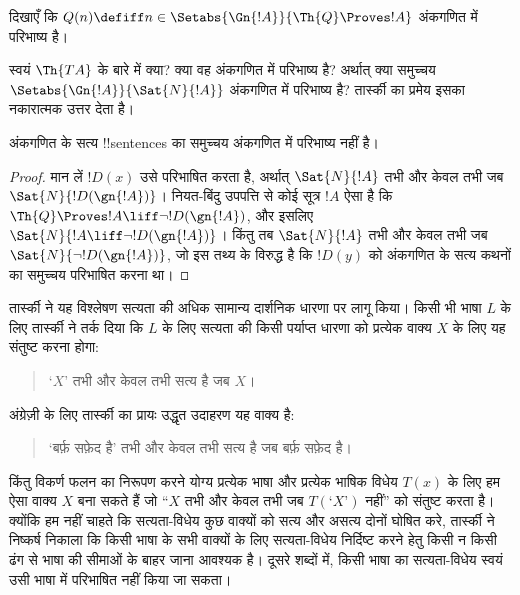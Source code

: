 \documentclass[../../../include/open-logic-section]{subfiles}
\begin{document}
\begin{prob}
दिखाएँ कि $Q(n) \defiff n \in \Setabs{\Gn{!A}}{\Th{Q} \Proves !A}$
अंकगणित में परिभाष्य है।
\end{prob}

स्वयं $\Th{TA}$ के बारे में क्या? क्या वह अंकगणित में परिभाष्य है? अर्थात्
क्या समुच्चय $\Setabs{\Gn{!A}}{\Sat{N}{!A}}$ अंकगणित में परिभाष्य है?
तार्स्की का प्रमेय इसका नकारात्मक उत्तर देता है।

\begin{thm}
अंकगणित के सत्य !!{sentence}s का समुच्चय अंकगणित में परिभाष्य नहीं है।
\end{thm}

\begin{proof}
मान लें $!D(x)$ उसे परिभाषित करता है, अर्थात् $\Sat{N}{!A}$ तभी और केवल
तभी जब $\Sat{N}{!D(\gn{!A})}$। नियत-बिंदु उपपत्ति से कोई सूत्र $!A$ ऐसा
है कि $\Th{Q} \Proves !A \liff \lnot !D(\gn{!A})$, और इसलिए
$\Sat{N}{!A \liff \lnot !D(\gn{!A})}$। किंतु तब $\Sat{N}{!A}$ तभी और
केवल तभी जब $\Sat{N}{\lnot !D(\gn{!A})}$, जो इस तथ्य के विरुद्ध है कि
$!D(y)$ को अंकगणित के सत्य कथनों का समुच्चय परिभाषित करना था।
\end{proof}

तार्स्की ने यह विश्लेषण सत्यता की अधिक सामान्य दार्शनिक धारणा पर लागू किया।
किसी भी भाषा $L$ के लिए तार्स्की ने तर्क दिया कि $L$ के लिए सत्यता की किसी
पर्याप्त धारणा को प्रत्येक वाक्य $X$ के लिए यह संतुष्ट करना होगा:
\begin{quote}
`$X$' तभी और केवल तभी सत्य है जब $X$।
\end{quote}
अंग्रेज़ी के लिए तार्स्की का प्रायः उद्धृत उदाहरण यह वाक्य है:
\begin{quote}
`बर्फ़ सफ़ेद है' तभी और केवल तभी सत्य है जब बर्फ़ सफ़ेद है।
\end{quote}
किंतु विकर्ण फलन का निरूपण करने योग्य प्रत्येक भाषा और प्रत्येक भाषिक
विधेय $T(x)$ के लिए हम ऐसा वाक्य $X$ बना सकते हैं जो ``$X$ तभी और केवल
तभी जब $T(\text{`$X$'})$ नहीं'' को संतुष्ट करता है। क्योंकि हम नहीं चाहते
कि सत्यता-विधेय कुछ वाक्यों को सत्य और असत्य दोनों घोषित करे, तार्स्की ने
निष्कर्ष निकाला कि किसी भाषा के सभी वाक्यों के लिए सत्यता-विधेय निर्दिष्ट
करने हेतु किसी न किसी ढंग से भाषा की सीमाओं के बाहर जाना आवश्यक है। दूसरे
शब्दों में, किसी भाषा का सत्यता-विधेय स्वयं उसी भाषा में परिभाषित नहीं किया
जा सकता।
\end{document}
